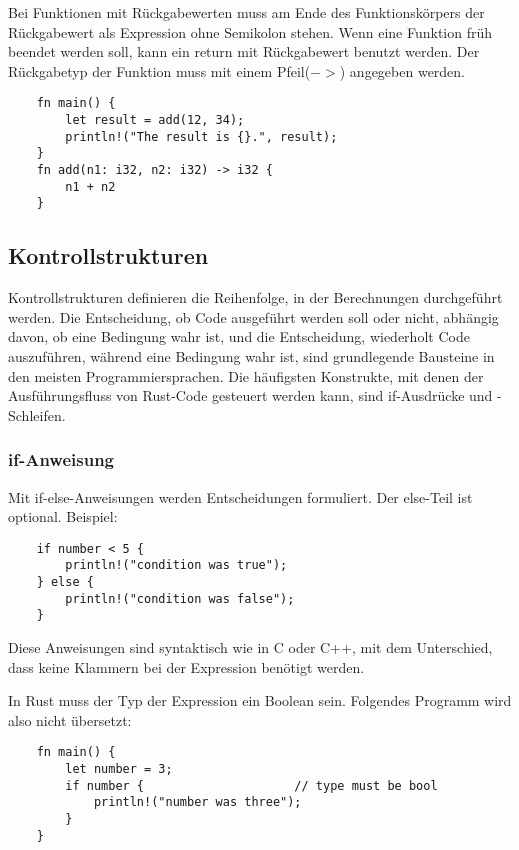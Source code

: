 Bei Funktionen mit Rückgabewerten muss am Ende des Funktionskörpers der Rückgabewert als Expression ohne Semikolon stehen. Wenn eine Funktion früh beendet werden soll, kann ein \glqq return\grqq{} mit Rückgabewert benutzt werden. Der Rückgabetyp der Funktion muss mit einem Pfeil($-$$>$) angegeben werden.

\begin{lstlisting}
    fn main() {
        let result = add(12, 34);
        println!("The result is {}.", result);
    }
    fn add(n1: i32, n2: i32) -> i32 {
        n1 + n2
    }
\end{lstlisting}

\subsection{Kontrollstrukturen}

Kontrollstrukturen definieren die Reihenfolge, in der Berechnungen durchgeführt werden. Die Entscheidung, ob Code ausgeführt werden soll oder nicht, abhängig davon, ob eine Bedingung wahr ist, und die Entscheidung, wiederholt Code aus\-zu\-füh\-ren, während eine Bedingung wahr ist, sind grundlegende Bausteine in den meisten Programmiersprachen. Die häufigsten Konstrukte, mit denen der Ausführungsfluss von Rust-Code gesteuert werden kann, sind if-Ausdrücke und -Schleifen.


\subsubsection{if-Anweisung}

Mit if-else-Anweisungen werden Entscheidungen formuliert. Der else-Teil ist optional. Beispiel:

\begin{lstlisting}
    if number < 5 {
        println!("condition was true");
    } else {
        println!("condition was false");
    }
\end{lstlisting}

Diese Anweisungen sind syntaktisch wie in C oder C++, mit dem Unterschied, dass keine Klammern bei der Expression benötigt werden.

In Rust muss der Typ der Expression ein Boolean sein. Folgendes Programm wird also nicht übersetzt:

\begin{lstlisting}
    fn main() {
        let number = 3;
        if number {                     // type must be bool
            println!("number was three");
        }
    }
\end{lstlisting}

